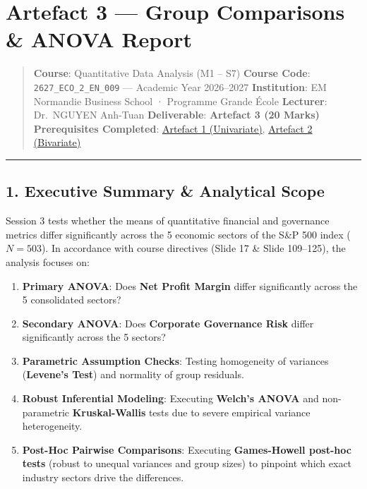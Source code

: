 \documentclass[
]{article}
\author{}
\date{}
\providecommand{\tightlist}{%
  \setlength{\itemsep}{0pt}\setlength{\parskip}{0pt}}
\begin{document}
\section{Artefact 3 --- Group Comparisons \& ANOVA
Report}\label{artefact-3-group-comparisons-anova-report}

\begin{quote}
\textbf{Course}: Quantitative Data Analysis (M1 -- S7) \textbf{Course
Code}: \texttt{2627\_ECO\_2\_EN\_009} --- Academic Year 2026--2027
\textbf{Institution}: EM Normandie Business School · Programme Grande
École \textbf{Lecturer}: Dr.~NGUYEN Anh-Tuan \textbf{Deliverable}:
\textbf{Artefact 3 (20 Marks)} \textbf{Prerequisites Completed}:
\href{Artefact_1_Session_1.md}{Artefact 1 (Univariate)},
\href{Artefact_2_Session_2.md}{Artefact 2 (Bivariate)}
\end{quote}

\begin{center}\rule{0.5\linewidth}{0.5pt}\end{center}

\subsection{1. Executive Summary \& Analytical
Scope}\label{executive-summary-analytical-scope}

Session 3 tests whether the means of quantitative financial and
governance metrics differ significantly across the 5 economic sectors of
the S\&P 500 index (\(N = 503\)). In accordance with course directives
(Slide 17 \& Slide 109--125), the analysis focuses on:

\begin{enumerate}
\def\labelenumi{\arabic{enumi}.}
\tightlist
\item
  \textbf{Primary ANOVA}: Does \textbf{Net Profit Margin} differ
  significantly across the 5 consolidated sectors?
\item
  \textbf{Secondary ANOVA}: Does \textbf{Corporate Governance Risk}
  differ significantly across the 5 sectors?
\item
  \textbf{Parametric Assumption Checks}: Testing homogeneity of
  variances (\textbf{Levene's Test}) and normality of group residuals.
\item
  \textbf{Robust Inferential Modeling}: Executing \textbf{Welch's ANOVA}
  and non-parametric \textbf{Kruskal-Wallis} tests due to severe
  empirical variance heterogeneity.
\item
  \textbf{Post-Hoc Pairwise Comparisons}: Executing \textbf{Games-Howell
  post-hoc tests} (robust to unequal variances and group sizes) to
  pinpoint which exact industry sectors drive the differences.
\end{enumerate}
\end{document}

